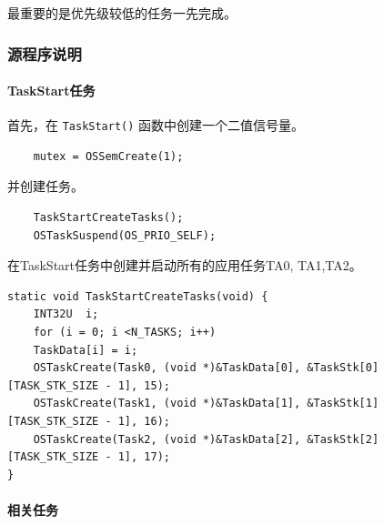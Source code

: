 \documentclass{ctexart}
\begin{document}
    最重要的是优先级较低的任务一先完成。

    \subsubsection{源程序说明}
    
    \paragraph{TaskStart任务}
    
    首先，在 \verb|TaskStart()| 函数中创建一个二值信号量。
    \begin{lstlisting}
    mutex = OSSemCreate(1);
    \end{lstlisting}
    并创建任务。
    \begin{lstlisting}
    TaskStartCreateTasks();
    OSTaskSuspend(OS_PRIO_SELF);
    \end{lstlisting}
    
    在TaskStart任务中创建并启动所有的应用任务TA0, TA1,TA2。
    \begin{lstlisting}
static void TaskStartCreateTasks(void) {
    INT32U  i;
    for (i = 0; i <N_TASKS; i++)
    TaskData[i] = i;
    OSTaskCreate(Task0, (void *)&TaskData[0], &TaskStk[0][TASK_STK_SIZE - 1], 15);
    OSTaskCreate(Task1, (void *)&TaskData[1], &TaskStk[1][TASK_STK_SIZE - 1], 16);
    OSTaskCreate(Task2, (void *)&TaskData[2], &TaskStk[2][TASK_STK_SIZE - 1], 17);
}
    \end{lstlisting}
    
    \paragraph{相关任务}
    
\end{document}

